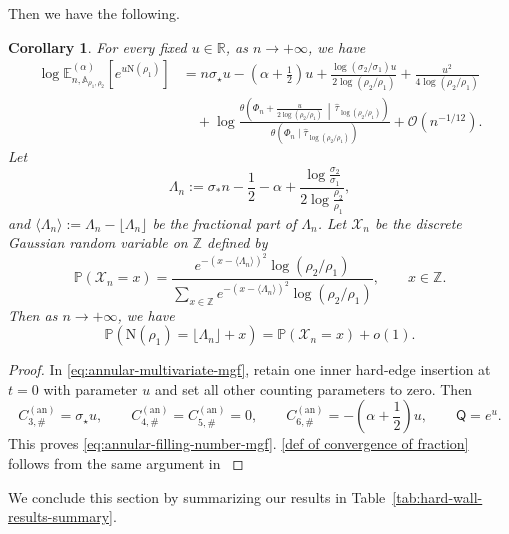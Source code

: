 \documentclass[a4paper]{article}
\newtheorem{corollary}[theorem]{Corollary}
\numberwithin{equation}{section}
\begin{document}

Then we have the following.


\begin{corollary}
\label{theorem:annular-filling-number-law}
For every fixed $u\in\mathbb R$, as $n\to+\infty$, we have 
\begin{align}
\log\mathbb E_{n,\mathbb A_{\rho_1,\rho_2}}^{(\alpha)}
\!\left[e^{u\mathrm N(\rho_1)}\right]
&=n\sigma_\star u-\left(\alpha+\frac12\right)u
+\frac{\log(\sigma_2/\sigma_1)u}{2\log(\rho_2/\rho_1)}+\frac{u^2}{4\log(\rho_2/\rho_1)}
\nonumber\\
&\quad
+\log\frac{\theta\!\left(
\Phi_n+\frac{u}{2\log(\rho_2/\rho_1)}\,\middle|\,\widehat \tau_{\log(\rho_2/\rho_1)}\right)}
{\theta(\Phi_n\mid \widehat \tau_{\log(\rho_2/\rho_1)})}
+\mathcal O(n^{-1/12}).
\label{eq:annular-filling-number-mgf}
\end{align}
Let 
\[
\Lambda_n:=\sigma_{\ast}n-\frac{1}{2}-\alpha+\frac{\log\frac{\sigma_2}{\sigma_1}}{2\log\frac{\rho_2}{\rho_1}},
\]
and $\langle \Lambda_n \rangle:=\Lambda_n-\lfloor \Lambda_n \rfloor$ be the fractional part of $\Lambda_n$. 
Let $\mathcal{X}_n$ be the discrete Gaussian random variable on $\mathbb Z$ defined by 
\[
\mathbb{P}(\mathcal{X}_n=x)=\frac{e^{-(x-\langle\Lambda_n\rangle)^2}\log(\rho_2/\rho_1)}{\sum_{x\in\mathbb Z}
e^{-(x-\langle\Lambda_n\rangle)^2}\log(\rho_2/\rho_1)},\qquad x\in \mathbb Z. 
\]
Then as $n\to+\infty$, we have 
\begin{equation}
\label{def of convergence of fraction}    
\mathbb{P}(\mathrm{N}(\rho_1)=\lfloor\Lambda_n\rfloor+x)=
\mathbb{P}(\mathcal{X}_n=x)+o(1).
\end{equation}
\end{corollary}

\begin{proof}
In \eqref{eq:annular-multivariate-mgf}, retain one inner hard-edge insertion
at $t=0$ with parameter $u$ and set all other counting parameters to zero.
Then
\[
C_{3,\#}^{(\mathrm{an})}=\sigma_\star u,
\qquad C_{4,\#}^{(\mathrm{an})}=C_{5,\#}^{(\mathrm{an})}=0,
\qquad C_{6,\#}^{(\mathrm{an})}
=-\left(\alpha+\frac12\right)u,
\qquad \mathsf Q=e^u.
\]
This proves \eqref{eq:annular-filling-number-mgf}.  
\eqref{def of convergence of fraction} follows from the same argument in \cite[Proof of Corollary 1.7]{ACCL2}

\end{proof}

We conclude this section by summarizing our results in Table~\ref{tab:hard-wall-results-summary}.
\end{document}
